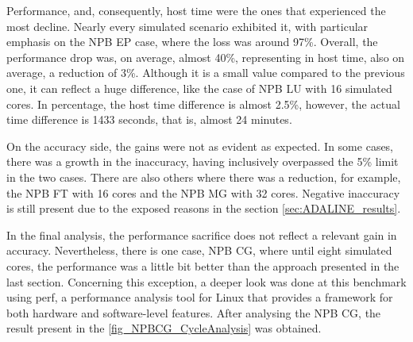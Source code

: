 Performance, and, consequently, host time were the ones that experienced the most decline. Nearly every simulated scenario exhibited it, 
with particular emphasis on the NPB EP case, where the loss was around 97\%. Overall, the performance drop was, on average, almost 40\%, 
representing in host time, also on average, a reduction of 3\%. Although it is a small value compared to the previous one, it can reflect a huge 
difference, like the case of NPB LU with 16 simulated cores. In percentage, the host time difference is almost 2.5\%, however, 
the actual time difference is 1433 seconds, that is, almost 24 minutes. 

On the accuracy side, the gains were not as evident as expected. In some cases, there was a growth in the inaccuracy, having inclusively overpassed
the 5\% limit in the two cases. There are also others where there was a reduction, for example, the NPB FT with 16 cores and the NPB MG with 32 
cores. Negative inaccuracy is still present due to the exposed reasons in the section \ref{sec:ADALINE_results}. 

In the final analysis, the performance sacrifice does not reflect a relevant gain in accuracy. Nevertheless, there is one case, NPB CG, where until 
eight simulated cores, the performance was a little bit better than the approach presented in the last section. Concerning this exception, a deeper look 
was done at this benchmark using perf, a performance analysis tool for Linux that provides a framework for both hardware and software-level 
features. After analysing the NPB CG, the result present in the \autoref{fig_NPBCG_CycleAnalysis} was obtained. 

